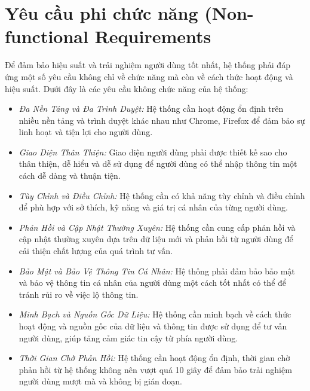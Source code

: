\section{Yêu cầu phi chức năng (Non-functional Requirements}

Để đảm bảo hiệu suất và trải nghiệm người dùng tốt nhất, hệ thống phải đáp ứng một số yêu cầu không chỉ về chức năng mà còn về cách thức hoạt động và hiệu suất. Dưới đây là các yêu cầu không chức năng của hệ thống:
\begin{itemize}
    \item \textit{Đa Nền Tảng và Đa Trình Duyệt:} Hệ thống cần hoạt động ổn định trên nhiều nền tảng và trình duyệt khác nhau như Chrome, Firefox để đảm bảo sự linh hoạt và tiện lợi cho người dùng.
    \item \textit{Giao Diện Thân Thiện:} Giao diện người dùng phải được thiết kế sao cho thân thiện, dễ hiểu và dễ sử dụng để người dùng có thể nhập thông tin một cách dễ dàng và thuận tiện.
    \item \textit{Tùy Chỉnh và Điều Chỉnh:} Hệ thống cần có khả năng tùy chỉnh và điều chỉnh để phù hợp với sở thích, kỹ năng và giá trị cá nhân của từng người dùng.
    \item \textit{Phản Hồi và Cập Nhật Thường Xuyên:} Hệ thống cần cung cấp phản hồi và cập nhật thường xuyên dựa trên dữ liệu mới và phản hồi từ người dùng để cải thiện chất lượng của quá trình tư vấn.
    \item \textit{Bảo Mật và Bảo Vệ Thông Tin Cá Nhân:} Hệ thống phải đảm bảo bảo mật và bảo vệ thông tin cá nhân của người dùng một cách tốt nhất có thể để tránh rủi ro về việc lộ thông tin.
    \item \textit{Minh Bạch và Nguồn Gốc Dữ Liệu:} Hệ thống cần minh bạch về cách thức hoạt động và nguồn gốc của dữ liệu và thông tin được sử dụng để tư vấn người dùng, giúp tăng cảm giác tin cậy từ phía người dùng.
    \item \textit{Thời Gian Chờ Phản Hồi:} Hệ thống cần hoạt động ổn định, thời gian chờ phản hồi từ hệ thống không nên vượt quá 10 giây để đảm bảo trải nghiệm người dùng mượt mà và không bị gián đoạn.
\end{itemize}